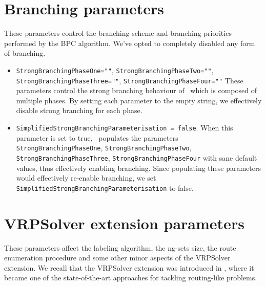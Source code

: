 \section{Branching parameters}
These parameters control the branching scheme and branching priorities performed by the BPC algorithm.
We've opted to completely disabled any form of branching.

\begin{itemize}
	\item \texttt{StrongBranchingPhaseOne=""}, \texttt{StrongBranchingPhaseTwo=""}, \texttt{StrongBranchingPhaseThree=""}, \texttt{StrongBranchingPhaseFour=""}
	      These parameters control the strong branching behaviour of \bapcod\, which is composed of multiple phases.
	      By setting each parameter to the empty string, we effectively disable strong branching for each phase.
	\item \texttt{SimplifiedStrongBranchingParameterisation = false}.
	      When this parameter is set to true, \bapcod\ populates the parameters \texttt{StrongBranchingPhaseOne}, \texttt{StrongBranchingPhaseTwo}, \texttt{StrongBranchingPhaseThree}, \texttt{StrongBranchingPhaseFour}
	      with sane default values, thus effectively enabling branching.
	      Since populating these parameters would effectively re-enable branching, we set \texttt{SimplifiedStrongBranchingParameterisation} to false.
\end{itemize}

\section{VRPSolver extension parameters}

These parameters affect the labeling algorithm, the ng-sets size,
the route enumeration procedure and some other minor aspects of the VRPSolver extension.
We recall that the VRPSolver extension was introduced in \textcite{pessoa2020generic},
where it became one of the state-of-the-art approaches for tackling routing-like problems.


